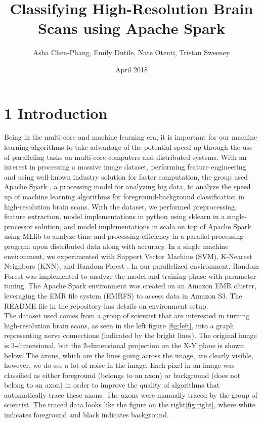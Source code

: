 \documentclass{neu_handout}
\title{Classifying High-Resolution Brain Scans using Apache Spark}
\author{Asha Chen-Phang, Emily Dutile, Nate Otenti, Tristan Sweeney}
\date{April 2018}
\begin{document}
\section*{1 Introduction}
Being in the multi-core and machine learning era, it is important for our machine learning algorithms to take advantage of the potential speed up through the use of paralleling tasks on multi-core computers and distributed systems. With an interest in processing a massive image dataset, performing feature engineering and using well-known industry solution for faster computation, the group used Apache Spark \cite{spark}, a processing model for analyzing big data, to analyze the speed up of machine learning algorithms for foreground-background classification in high-resolution brain scans. With the dataset, we performed preprocessing, feature extraction, model implementations in python using sklearn in a single-processor solution, and model implementations in scala on top of Apache Spark using MLlib to analyze time and processing efficiency in a parallel processing program upon distributed data along with accuracy. In a single machine environment, we experimented with Support Vector Machine (SVM), K-Nearest Neighbors (KNN), and Random Forest \cite{randomforestclassifier}. In our parallelized environment, Random Forest was implemented to analyze the model and training phase with parameter tuning. The Apache Spark environment was created on an Amazon EMR \cite{amazonemr} cluster, leveraging the EMR file system (EMRFS) to access data in Amazon S3. The README file in the repository has details on environment setup. \\

The dataset used comes from a group of scientist that are interested in turning high-resolution brain scans, as seen in the left figure \ref{fig:left}, into a graph representing nerve connections (indicated by the bright lines). The original image is 3-dimensional, but the 2-dimensional projection on the X-Y plane is shown below. The axons, which are the lines going across the image, are clearly visible, however, we do see a lot of noise in the image. Each pixel in an image was classified as either foreground (belongs to an axon) or background (does not belong to an axon) in order to improve the quality of algorithms that automatically trace these axons. The axons were manually traced by the group of scientist. The traced data looks like the figure on the right\ref{fig:right}, where white indicates foreground and black indicates background.\\
\end{document}
